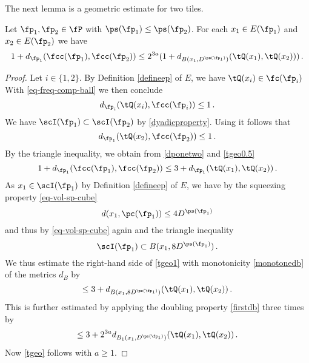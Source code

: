 The next lemma is a geometric estimate for two tiles.
\begin{lemma}\label{tile-uncertainty}
    Let $\fp_1, \fp_2\in \fP$ with
$\ps({\fp_1})\leq \ps({\fp_2})$. For each $x_1\in E(\fp_1)$ and
$x_2\in E(\fp_2)$ we have
\begin{equation}\label{tgeo}
  1+d_{\fp_1}(\fcc(\fp_1), \fcc(\fp_2))\le
    2^{3a}(1 + d_{B(x_1, D^{\ps(\fp_1)})}(\tQ(x_1),\tQ(x_2)))\, .
\end{equation}
\end{lemma}
\begin{proof}
Let $i\in \{1,2\}$.
By Definition \eqref{defineep} of $E$,
we have $\tQ(x_i)\in \fc(\fp_i)$
With \eqref{eq-freq-comp-ball} we then conclude
\begin{equation}\label{dponetwo}
    d_{\fp_i}(\tQ(x_i),\fcc(\fp_i))\le 1\, .
\end{equation}
We have $\scI(\fp_1)\subset \scI(\fp_2)$ by \eqref{dyadicproperty}. Using  it follows that
\begin{equation}\label{tgeo0.5}
    d_{\fp_1}(\tQ(x_2), \fcc(\fp_2)) \le 1\,.
\end{equation}
By the triangle inequality, we obtain from \eqref{dponetwo} and
\eqref{tgeo0.5}
\begin{equation}\label{tgeo1}
     1+d_{\fp_1}(\fcc(\fp_1), \fcc(\fp_2))\le 3 +d_{\fp_1}(\tQ(x_1), \tQ(x_2))\, .
\end{equation}
As $x_1\in \scI(\fp_1)$ by Definition \eqref{defineep} of $E$, we have by the squeezing property \eqref{eq-vol-sp-cube}
\begin{equation}
    d(x_1,\pc(\fp_1))\le 4D^{\ps(\fp_1)}
\end{equation}
and thus by \eqref{eq-vol-sp-cube} again and the triangle inequality
\begin{equation}
    \scI(\fp_1)\subset B(x_1,8D^{\ps(\fp_1)})\, .
\end{equation}
We thus estimate the right-hand side of \eqref{tgeo1} with monotonicity \eqref{monotonedb} of the metrics $d_B$ by
\begin{equation}\label{tgeo1.5}
    \le 3+d_{B(x_1,8D^{\ps(\fp_1)})}(\tQ(x_1), \tQ(x_2))\, .
\end{equation}
This is further estimated by applying the doubling property \eqref{firstdb} three times by
\begin{equation}\label{tgeo2}
    \le 3+2^{3a}d_{B_1(x_1, D^{\ps(\fp_1)})}(\tQ(x_1), \tQ(x_2))\, .
\end{equation}
Now \eqref{tgeo} follows with $a\ge 1$.
\end{proof}




